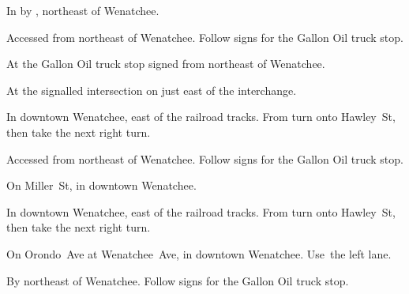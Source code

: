 
\begin{LocationList}

In  by  , northeast of Wenatchee.

Accessed from   northeast of Wenatchee.
Follow signs for the Gallon Oil truck stop.

At the Gallon Oil truck stop signed from   northeast of Wenatchee.

\Location{\GarageHQ \Garage}
At the signalled intersection on   just east of the  interchange.

In downtown Wenatchee, east of the railroad tracks.
From  turn onto Hawley~St, then take the next right turn.

Accessed from   northeast of Wenatchee.
Follow signs for the Gallon Oil truck stop.

\Location{\RecruitmentAgency \Recruitment}
On Miller~St, in downtown Wenatchee.

In downtown Wenatchee, east of the railroad tracks.
From  turn onto Hawley~St, then take the next right turn.

On Orondo~Ave at Wenatchee~Ave, in downtown Wenatchee.
Use~the left lane.

By   northeast of Wenatchee.
Follow signs for the Gallon Oil truck stop.

\end{LocationList}
